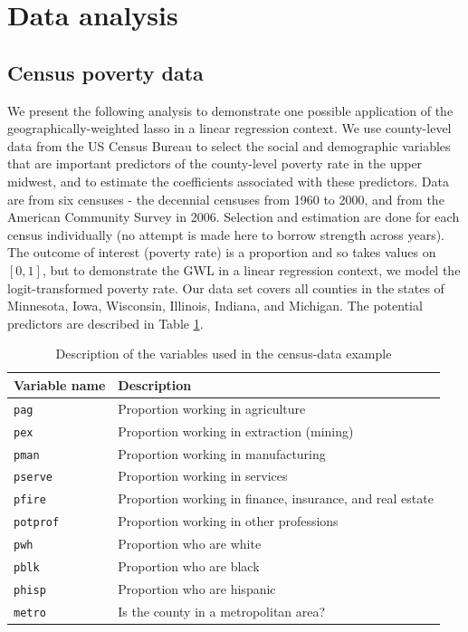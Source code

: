 \documentclass[authoryear, review, 11pt]{elsarticle}
\begin{document}
	



			
\section{Data analysis}
	\subsection{Census poverty data}
	We present the following analysis to demonstrate one possible application of the geographically-weighted lasso in a linear regression context. We use county-level data from the US Census Bureau to select the social and demographic variables that are important predictors of the county-level poverty rate in the upper midwest, and to estimate the coefficients associated with these predictors. Data are from six censuses - the decennial censuses from 1960 to 2000, and from the American Community Survey in 2006. Selection and estimation are done for each census individually (no attempt is made here to borrow strength across years). The outcome of interest (poverty rate) is a proportion and so takes values on $[0,1]$, but to demonstrate the GWL in a linear regression context, we model the logit-transformed poverty rate. Our data set covers all counties in the states of Minnesota, Iowa, Wisconsin, Illinois, Indiana, and Michigan. The potential predictors are described in Table \ref{table:census-vars}.\\
	
	\begin{table}
		\begin{center}
		\begin{tabular}{ll}
			Variable name & Description \\
			\hline
			\verb!pag! & Proportion working in agriculture\\
			\verb!pex! &  Proportion working in extraction (mining)\\
			\verb!pman! & Proportion working in manufacturing \\
			\verb!pserve! & Proportion working in services \\
			\verb!pfire! & Proportion working in finance, insurance, and real estate \\
			\verb!potprof! & Proportion working in other professions \\
			\verb!pwh! & Proportion who are white \\
			\verb!pblk! & Proportion who are black \\
			\verb!phisp! & Proportion who are hispanic \\
			\verb!metro! & Is the county in a metropolitan area?\\
		\end{tabular}
		\caption{Description of the variables used in the census-data example\label{table:census-vars}}
		\end{center}		
	\end{table}
	
\end{document}
